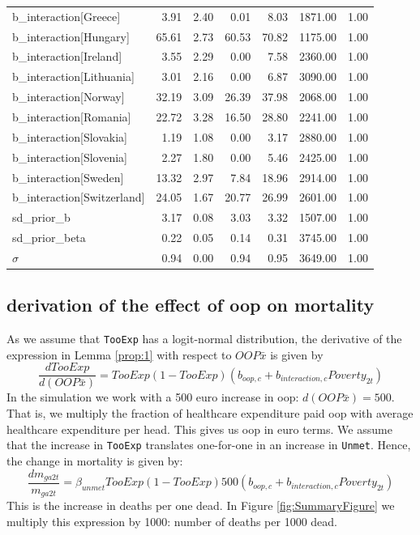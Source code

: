 \documentclass[a4paper,12pt]{article}
\begin{document}
\begin{table}[htbp]
\begin{tabular}{lrrrrrr}
b\_interaction[Greece] & 3.91 & 2.40 & 0.01 & 8.03 & 1871.00 & 1.00\\[0pt]
b\_interaction[Hungary] & 65.61 & 2.73 & 60.53 & 70.82 & 1175.00 & 1.00\\[0pt]
b\_interaction[Ireland] & 3.55 & 2.29 & 0.00 & 7.58 & 2360.00 & 1.00\\[0pt]
b\_interaction[Lithuania] & 3.01 & 2.16 & 0.00 & 6.87 & 3090.00 & 1.00\\[0pt]
b\_interaction[Norway] & 32.19 & 3.09 & 26.39 & 37.98 & 2068.00 & 1.00\\[0pt]
b\_interaction[Romania] & 22.72 & 3.28 & 16.50 & 28.80 & 2241.00 & 1.00\\[0pt]
b\_interaction[Slovakia] & 1.19 & 1.08 & 0.00 & 3.17 & 2880.00 & 1.00\\[0pt]
b\_interaction[Slovenia] & 2.27 & 1.80 & 0.00 & 5.46 & 2425.00 & 1.00\\[0pt]
b\_interaction[Sweden] & 13.32 & 2.97 & 7.84 & 18.96 & 2914.00 & 1.00\\[0pt]
b\_interaction[Switzerland] & 24.05 & 1.67 & 20.77 & 26.99 & 2601.00 & 1.00\\[0pt]
sd\_prior\_b & 3.17 & 0.08 & 3.03 & 3.32 & 1507.00 & 1.00\\[0pt]
sd\_prior\_beta & 0.22 & 0.05 & 0.14 & 0.31 & 3745.00 & 1.00\\[0pt]
\(\sigma\) & 0.94 & 0.00 & 0.94 & 0.95 & 3649.00 & 1.00\\[0pt]
\end{tabular}
\end{table}


\subsection{derivation of the effect of oop on mortality}
\label{sec:orgda7bade}

As we assume that \texttt{TooExp} has a logit-normal distribution, the derivative of the expression in Lemma \ref{prop:1} with respect to \(OOP \bar{x}\) is given by
\begin{equation}
\frac{dTooExp}{d(OOP \bar{x})} = TooExp(1-TooExp) (b_{oop,c} + b_{interaction,c} Poverty_{2t})
\end{equation}
In the simulation we work with a 500 euro increase in oop: \(d(OOP \bar{x})=500\). That is, we multiply the fraction of healthcare expenditure paid oop with average healthcare expenditure per head. This gives us oop in euro terms. We assume that the increase in \texttt{TooExp} translates one-for-one in an increase in \texttt{Unmet}. Hence, the change in mortality is given by:
\begin{equation}
\label{eq:effect_per_1000}
\frac{dm_{ga2t}}{m_{ga2t}} = \beta_{unmet} TooExp(1-TooExp) 500 (b_{oop,c} + b_{interaction,c} Poverty_{2t})
\end{equation}
This is the increase in deaths per one dead. In Figure \ref{fig:SummaryFigure} we multiply this expression by 1000: number of deaths per 1000 dead.
\end{document}
